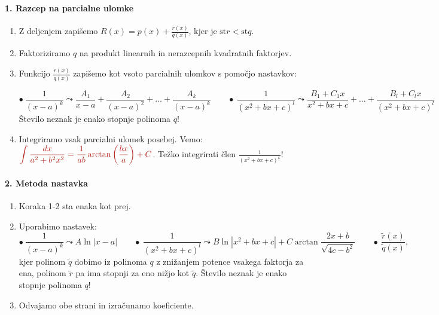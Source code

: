 \paragraph*{1. Razcep na parcialne ulomke}
\begin{enumerate}
    \item Z deljenjem zapišemo $\displaystyle R(x) = p(x) + \frac{r(x)}{q(x)}$, kjer je $\text{st}r< \text{st}q$.
    \item Faktoriziramo $q$ na produkt linearnih in nerazcepnih kvadratnih faktorjev.
    \item Funkcijo $\frac{r(x)}{q(x)}$ zapišemo kot vsoto parcialnih ulomkov s pomočjo nastavkov:
    
    $$\bullet \ \frac{1}{(x-a)^k} \leadsto \frac{A_1}{x-a} + \frac{A_2}{(x-a)^2} + \ldots + \frac{A_k}{(x-a)^k} \qquad \bullet \ \frac{1}{(x^2+bx+c)^l} \leadsto \frac{B_1 + C_1 x}{x^2+bx+c} + \ldots + \frac{B_l + C_l x}{(x^2+bx+c)^l}$$
    Število neznak je enako stopnje polinoma $q$!
    \item Integriramo vsak parcialni ulomek posebej. Vemo: $\color{BrickRed} \displaystyle \int \frac{dx}{a^2+b^2 x^2} = \frac{1}{ab} \arctan \left(\frac{bx}{a}\right) + C$. Težko integrirati člen $\displaystyle \frac{1}{(x^2+bx+c)^k}$! 
\end{enumerate}

\paragraph*{2. Metoda nastavka}
\begin{enumerate}
    \item Koraka 1-2 sta enaka kot prej.
    \item Uporabimo nastavek:
    $$
    \bullet \ \frac{1}{(x-a)^k} \leadsto A \ln |x-a| \qquad \bullet \ \frac{1}{(x^2+bx+c)^l} \leadsto B \ln |x^2+bx+c| + C \arctan \frac{2x+b}{\sqrt{4c-b^2}} \qquad \bullet \ \frac{\widetilde{r}(x)}{\widetilde{q}(x)},
    $$
    kjer polinom $\widetilde{q}$ dobimo iz polinoma $q$ z znižanjem potence vsakega faktorja za ena, polinom $\widetilde{r}$ pa ima stopnji za eno nižjo kot $\widetilde{q}$.
    Število neznak je enako stopnje polinoma $q$!
    \item Odvajamo obe strani in izračunamo koeficiente.
\end{enumerate}

